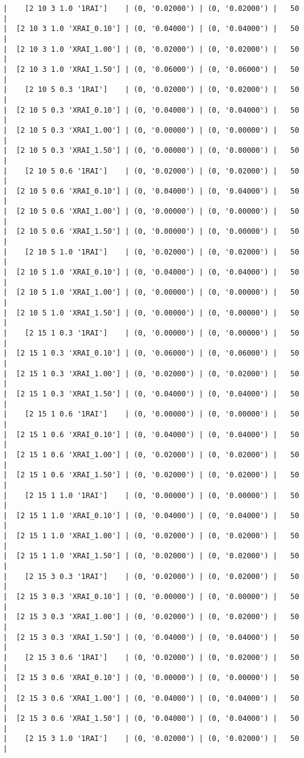 \documentclass{article}
\begin{document}
\begin{verbatim}
|    [2 10 3 1.0 '1RAI']    | (0, '0.02000') | (0, '0.02000') |   50  |
|  [2 10 3 1.0 'XRAI_0.10'] | (0, '0.04000') | (0, '0.04000') |   50  |
|  [2 10 3 1.0 'XRAI_1.00'] | (0, '0.02000') | (0, '0.02000') |   50  |
|  [2 10 3 1.0 'XRAI_1.50'] | (0, '0.06000') | (0, '0.06000') |   50  |
|    [2 10 5 0.3 '1RAI']    | (0, '0.02000') | (0, '0.02000') |   50  |
|  [2 10 5 0.3 'XRAI_0.10'] | (0, '0.04000') | (0, '0.04000') |   50  |
|  [2 10 5 0.3 'XRAI_1.00'] | (0, '0.00000') | (0, '0.00000') |   50  |
|  [2 10 5 0.3 'XRAI_1.50'] | (0, '0.00000') | (0, '0.00000') |   50  |
|    [2 10 5 0.6 '1RAI']    | (0, '0.02000') | (0, '0.02000') |   50  |
|  [2 10 5 0.6 'XRAI_0.10'] | (0, '0.04000') | (0, '0.04000') |   50  |
|  [2 10 5 0.6 'XRAI_1.00'] | (0, '0.00000') | (0, '0.00000') |   50  |
|  [2 10 5 0.6 'XRAI_1.50'] | (0, '0.00000') | (0, '0.00000') |   50  |
|    [2 10 5 1.0 '1RAI']    | (0, '0.02000') | (0, '0.02000') |   50  |
|  [2 10 5 1.0 'XRAI_0.10'] | (0, '0.04000') | (0, '0.04000') |   50  |
|  [2 10 5 1.0 'XRAI_1.00'] | (0, '0.00000') | (0, '0.00000') |   50  |
|  [2 10 5 1.0 'XRAI_1.50'] | (0, '0.00000') | (0, '0.00000') |   50  |
|    [2 15 1 0.3 '1RAI']    | (0, '0.00000') | (0, '0.00000') |   50  |
|  [2 15 1 0.3 'XRAI_0.10'] | (0, '0.06000') | (0, '0.06000') |   50  |
|  [2 15 1 0.3 'XRAI_1.00'] | (0, '0.02000') | (0, '0.02000') |   50  |
|  [2 15 1 0.3 'XRAI_1.50'] | (0, '0.04000') | (0, '0.04000') |   50  |
|    [2 15 1 0.6 '1RAI']    | (0, '0.00000') | (0, '0.00000') |   50  |
|  [2 15 1 0.6 'XRAI_0.10'] | (0, '0.04000') | (0, '0.04000') |   50  |
|  [2 15 1 0.6 'XRAI_1.00'] | (0, '0.02000') | (0, '0.02000') |   50  |
|  [2 15 1 0.6 'XRAI_1.50'] | (0, '0.02000') | (0, '0.02000') |   50  |
|    [2 15 1 1.0 '1RAI']    | (0, '0.00000') | (0, '0.00000') |   50  |
|  [2 15 1 1.0 'XRAI_0.10'] | (0, '0.04000') | (0, '0.04000') |   50  |
|  [2 15 1 1.0 'XRAI_1.00'] | (0, '0.02000') | (0, '0.02000') |   50  |
|  [2 15 1 1.0 'XRAI_1.50'] | (0, '0.02000') | (0, '0.02000') |   50  |
|    [2 15 3 0.3 '1RAI']    | (0, '0.02000') | (0, '0.02000') |   50  |
|  [2 15 3 0.3 'XRAI_0.10'] | (0, '0.00000') | (0, '0.00000') |   50  |
|  [2 15 3 0.3 'XRAI_1.00'] | (0, '0.02000') | (0, '0.02000') |   50  |
|  [2 15 3 0.3 'XRAI_1.50'] | (0, '0.04000') | (0, '0.04000') |   50  |
|    [2 15 3 0.6 '1RAI']    | (0, '0.02000') | (0, '0.02000') |   50  |
|  [2 15 3 0.6 'XRAI_0.10'] | (0, '0.00000') | (0, '0.00000') |   50  |
|  [2 15 3 0.6 'XRAI_1.00'] | (0, '0.04000') | (0, '0.04000') |   50  |
|  [2 15 3 0.6 'XRAI_1.50'] | (0, '0.04000') | (0, '0.04000') |   50  |
|    [2 15 3 1.0 '1RAI']    | (0, '0.02000') | (0, '0.02000') |   50  |

\end{verbatim}
\end{document}
